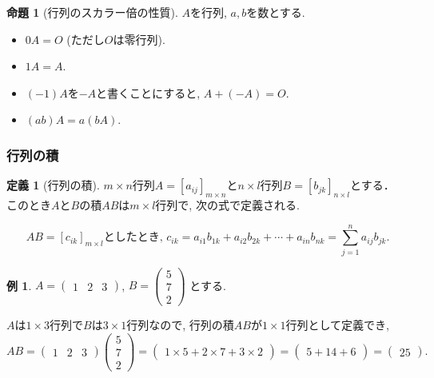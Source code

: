 \documentclass[dvipdfmx,a4paper,11pt]{article}
\theoremstyle{definition}
\newtheorem{prop}[thm]{命題}
\newtheorem{dfn}[thm]{定義}
\newtheorem{exa}[thm]{例}
\begin{document}
 
 \begin{tcolorbox}[
    colback = white,
    colframe = green!35!black,
    fonttitle = \bfseries,
    breakable = true]
    \begin{prop}[行列のスカラー倍の性質]
$A$を行列, $a,b$を数とする.
 \begin{itemize}
   \setlength{\parskip}{0cm} 
  \setlength{\itemsep}{0cm}
 \item $0A =O$ (ただし$O$は零行列).
  \item $1A=A$. 
  \item $(-1)A$を$-A$と書くことにすると, $A + (-A) =O$.　
  \item $(ab) A = a(bA)$.
 \end{itemize}
  \end{prop}
 \end{tcolorbox}
 
 \subsubsection{行列の積}
 
  \begin{tcolorbox}[
    colback = white,
    colframe = green!35!black,
    fonttitle = \bfseries,
    breakable = true]
    \begin{dfn}[行列の積]
    
 $m \times n$行列$A = [a_{ij}]_{m \times n}$と$n \times l$行列$B= [b_{jk}]_{n \times l}$とする．
このとき$A$と$B$の積$AB$は$m \times l$行列で, 次の式で定義される.

$$
AB = [c_{ik}]_{m \times l}\text{としたとき, }
c_{ik} = a_{i1}b_{1k} + a_{i2}b_{2k} + \cdots + a_{in}b_{nk} = \sum_{j=1}^{n} a_{ij}b_{jk}.
$$
  \end{dfn}
 \end{tcolorbox}
 
 \begin{exa}
 $ A=\begin{pmatrix} 1 &2 &3 \end{pmatrix}$, 
 $ 
 B = 
 \begin{pmatrix}
5 \\7\\2
 \end{pmatrix}
 $
 とする. 
 
 $A$は$1\times 3$行列で$B$は$3 \times 1$行列なので, 行列の積$AB$が$1 \times 1$行列として定義でき, 
 $$
 AB = \begin{pmatrix}1 &2&3  \end{pmatrix}
 \begin{pmatrix}
5 \\7\\2
 \end{pmatrix}
 = \begin{pmatrix}1\times 5 + 2 \times 7 + 3 \times 2  \end{pmatrix}= 
  \begin{pmatrix}5+14+6 \end{pmatrix}= \begin{pmatrix}25 \end{pmatrix}.
 $$
 
 \end{exa}
 
\end{document}
